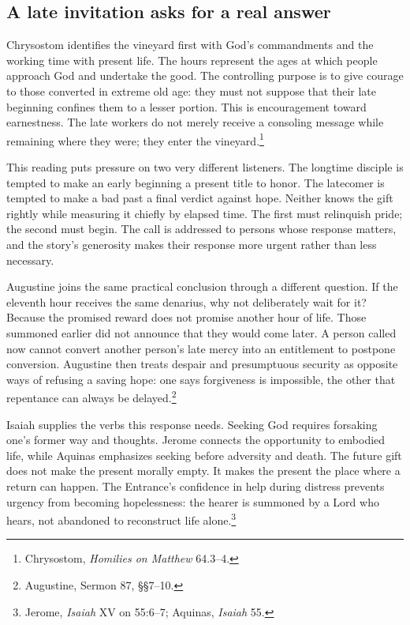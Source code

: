 \subsection{A late invitation asks for a real answer}
Chrysostom identifies the vineyard first with God's commandments and the working time with present life. The hours represent the ages at which people approach God and undertake the good. The controlling purpose is to give courage to those converted in extreme old age: they must not suppose that their late beginning confines them to a lesser portion. This is encouragement toward earnestness. The late workers do not merely receive a consoling message while remaining where they were; they enter the vineyard.\footnote{Chrysostom, \textit{Homilies on Matthew} 64.3--4.}

This reading puts pressure on two very different listeners. The longtime disciple is tempted to make an early beginning a present title to honor. The latecomer is tempted to make a bad past a final verdict against hope. Neither knows the gift rightly while measuring it chiefly by elapsed time. The first must relinquish pride; the second must begin. The call is addressed to persons whose response matters, and the story's generosity makes their response more urgent rather than less necessary.

Augustine joins the same practical conclusion through a different question. If the eleventh hour receives the same denarius, why not deliberately wait for it? Because the promised reward does not promise another hour of life. Those summoned earlier did not announce that they would come later. A person called now cannot convert another person's late mercy into an entitlement to postpone conversion. Augustine then treats despair and presumptuous security as opposite ways of refusing a saving hope: one says forgiveness is impossible, the other that repentance can always be delayed.\footnote{Augustine, Sermon 87, §§7--10.}

Isaiah supplies the verbs this response needs. Seeking God requires forsaking one's former way and thoughts. Jerome connects the opportunity to embodied life, while Aquinas emphasizes seeking before adversity and death. The future gift does not make the present morally empty. It makes the present the place where a return can happen. The Entrance's confidence in help during distress prevents urgency from becoming hopelessness: the hearer is summoned by a Lord who hears, not abandoned to reconstruct life alone.\footnote{Jerome, \textit{Isaiah} XV on 55:6--7; Aquinas, \textit{Isaiah} 55.}

